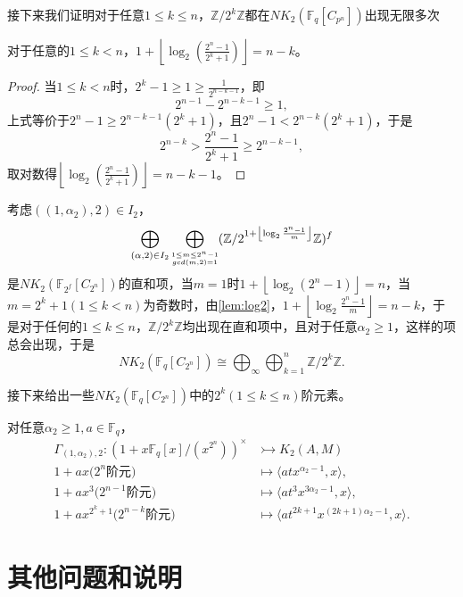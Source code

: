 接下来我们证明对于任意$1\leq k\leq n$，$\mathbb{Z}/2^k \mathbb{Z}$都在$NK_2(\mathbb{F}_q[C_{p^n}])$出现无限多次

\begin{lemma}
\label{lem:log2}
	对于任意的$1\leq k < n$，$1+\left \lfloor \log_2(\frac{2^n-1}{2^k+1}) \right \rfloor = n-k$。
\end{lemma}
\begin{proof}
	当$1\leq k < n$时，$2^k-1\geq 1 \geq \frac{1}{2^{n-k-1}}$，即
	\[2^{n-1}-2^{n-k-1}\geq 1, \]
	上式等价于$2^n-1\geq 2^{n-k-1}(2^k+1)$，且$2^n-1<2^{n-k}(2^k+1)$，于是
	\[2^{n-k}> \frac{2^n-1}{2^k+1} \geq 2^{n-k-1},\]
	取对数得$\left \lfloor \log_2(\frac{2^n-1}{2^k+1}) \right \rfloor = n-k-1$。
\end{proof}
考虑$((1,\alpha_2),2)\in I_2$，
$$\bigoplus_{(\alpha,2)\in I_2}\bigoplus_{\scriptsize\substack{1\leq m\leq  2^n-1 \\ gcd(m,2)=1 }}(\mathbb{Z}/2^{1+ \left \lfloor\log_2 \frac{2^n-1}{m}  \right \rfloor}\mathbb{Z})^f$$
是$NK_2(\mathbb{F}_{2^f}[C_{2^n}])$的直和项，当$m=1$时$1+ \left \lfloor\log_2 (2^n-1)\right \rfloor=n$，当$m=2^k+1 (1\leq k < n)$为奇数时，由\ref{lem:log2}，$1+ \left \lfloor\log_2 \frac{2^n-1}{m}\right \rfloor=n-k$，{\color{blue}于是对于任何的$1\leq k\leq n$，$\mathbb{Z}/2^k\mathbb{Z}$均出现在直和项中，且对于任意$\alpha_2\geq 1$，这样的项总会出现}，于是
\[NK_2(\mathbb{F}_q[C_{2^n}])\cong \bigoplus_\infty \bigoplus_{k=1}^n \mathbb{Z}/2^k\mathbb{Z}.\]

接下来给出一些$NK_2(\mathbb{F}_q[C_{2^n}])$中的$2^k(1\leq k \leq n)$阶元素。

对任意$\alpha_2\geq 1, a\in \mathbb{F}_q$，
  \begin{align*}
 \Gamma_{(1,\alpha_2),2} \colon (1+x \mathbb{F}_q[x]/(x^{2^n}))^{\times} &\rightarrowtail K_2(A,M)\\
 1+ax \text{($2^n$阶元)} &\mapsto \langle atx^{\alpha_2-1},x \rangle,\\
 1+ax^3 \text{($2^{n-1}$阶元)} &\mapsto \langle at^3x^{3\alpha_2-1},x \rangle,\\
 1+ax^{2^k+1} \text{($2^{n-k}$阶元)} &\mapsto \langle at^{2k+1}x^{(2k+1)\alpha_2-1},x \rangle.
 \end{align*}






% 



\section{其他问题和说明}

